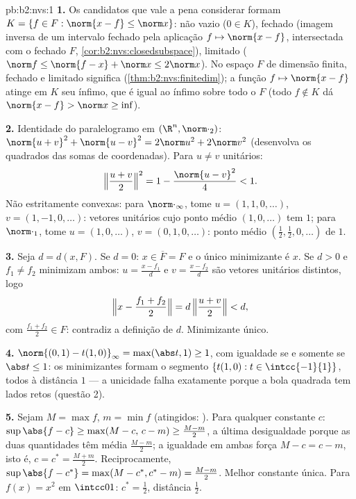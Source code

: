 \begin{solution}{pb:b2:nvs:1}
\textbf{1.} Os candidatos que vale a pena considerar formam $K = \{f \in F
: \norm{x - f} \leq \norm x\}$: não vazio ($0 \in K$), fechado
(imagem inversa de um intervalo fechado pela aplicação  $f \mapsto
\norm{x - f}$, intersectada com o fechado $F$,
\cref{cor:b2:nvs:closedsubspace}), limitado ($\norm f \leq
\norm{f - x} + \norm x \leq 2\norm x$). No
espaço $F$ de dimensão finita, fechado e limitado significa 
(\cref{thm:b2:nvs:finitedim}); a função  $f
\mapsto \norm{x - f}$ atinge em $K$ seu ínfimo, que é igual
ao ínfimo sobre todo o $F$ (todo $f \notin K$ dá $\norm{x -
f} > \norm x \geq \inf$).

\textbf{2.} Identidade do paralelogramo em $(\R^n,
\norm\cdot_2)$: $\norm{u + v}^2 + \norm{u - v}^2 = 2\norm u^2 +
2\norm v^2$ (desenvolva os quadrados das somas de coordenadas). Para
$u \neq v$ unitários:
\[
\Bigl\Vert\frac{u+v}2\Bigr\Vert^2 = 1 - \frac{\norm{u -
v}^2}{4} < 1 .
\]
Não estritamente convexas: para $\norm\cdot_\infty$, tome $u = (1, 1, 0,
\dots)$, $v = (1, -1, 0, \dots)$: vetores unitários cujo ponto médio
$(1, 0, \dots)$ tem  $1$; para $\norm\cdot_1$, tome $u = (1,
0, \dots)$, $v = (0, 1, 0, \dots)$: ponto médio $(\frac12,
\frac12, 0, \dots)$ de  $1$.

\textbf{3.} Seja $d = d(x, F)$. Se $d = 0$: $x \in \overline F =
F$ e o único minimizante é $x$. Se $d > 0$ e $f_1 \neq f_2$
minimizam ambos: $u = \frac{x - f_1}{d}$ e $v = \frac{x -
f_2}{d}$ são vetores unitários distintos, logo
\[
\Bigl\Vert x - \frac{f_1 + f_2}2\Bigr\Vert
= d\,\Bigl\Vert\frac{u + v}2\Bigr\Vert < d ,
\]
com $\frac{f_1 + f_2}2 \in F$: contradiz a definição de
$d$. Minimizante único.

\textbf{4.} $\norm{(0,1) - t(1,0)}_\infty = \max(\abs t, 1)
\geq 1$, com igualdade se e somente se $\abs t \leq 1$: os minimizantes formam
o segmento $\{t(1, 0) : t \in \intcc{-1}{1}\}$, todos à distância
$1$ --- a unicidade falha exatamente porque a bola quadrada tem
lados retos (questão 2).

\textbf{5.} Sejam $M = \max f$, $m = \min f$ (atingidos:
). Para qualquer constante $c$: $\sup\abs{f - c} \geq
\max(M - c,\, c - m) \geq \frac{M - m}2$, a última desigualdade
porque as duas quantidades têm média $\frac{M-m}2$; a igualdade em
ambas força $M - c = c - m$, isto é, $c = c^* = \frac{M + m}2$.
Reciprocamente, $\sup\abs{f - c^*} = \max(M - c^*, c^* - m) =
\frac{M - m}2$. Melhor constante única. Para $f(x) = x^2$ em
$\intcc01$: $c^* = \frac12$, distância $\frac12$.


\end{solution}
